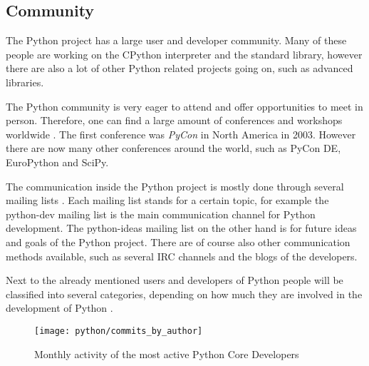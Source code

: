 
\subsection{Community} %
\label{sub:Community}

The Python project has a large user and developer community. Many of these people are
working on the CPython interpreter and the standard library, however there are
also a lot of other Python related projects going on, such as advanced libraries.

The Python community is very eager to attend and offer opportunities to meet in
person. Therefore, one can find a large amount of conferences and workshops
worldwide \cite{PythonConferences}. The first conference was \emph{PyCon} in
North America in 2003. However there are now many other conferences around the
world, such as PyCon DE, EuroPython and SciPy.

The communication inside the Python project is mostly done through several
mailing lists \cite{PythonCommunication}. Each mailing list stands for a
certain topic, for example the python-dev mailing list is the main
communication channel for Python development. The python-ideas mailing list on
the other hand is for future ideas and goals of the Python project. There are
of course also other communication methods available, such as several \ac{IRC}
channels and the blogs of the developers.

Next to the already mentioned users and developers of Python people will be
classified into several categories, depending on how much they are involved in
the development of Python \cite{PythonCoreDeveloper}.

\begin{figure}[htbp]
  \centering
  \texttt{[image: python/commits\_by\_author]}
  \caption{Monthly activity of the most active Python Core Developers}
\end{figure}

